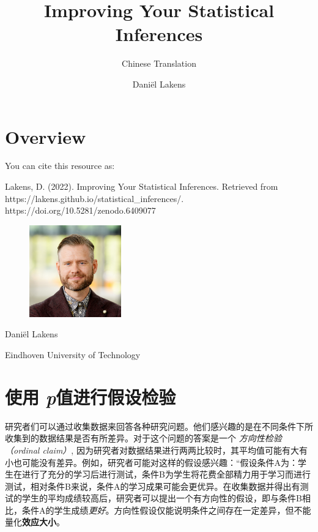 \documentclass[
  letterpaper,
  DIV=11,
  numbers=noendperiod]{scrreprt}
\title{Improving Your Statistical Inferences}
\subtitle{Chinese Translation}
\author{Daniël Lakens}
\date{}
\renewcommand*\contentsname{Table of contents}
\newcommand\contentsname{Table of contents}
\begin{document}
\maketitle
\ifdefined\Shaded\renewenvironment{Shaded}{\begin{tcolorbox}[breakable, interior hidden, frame hidden, boxrule=0pt, sharp corners, borderline west={3pt}{0pt}{shadecolor}, enhanced]}{\end{tcolorbox}}\fi

\renewcommand*\contentsname{Table of contents}
{
\hypersetup{linkcolor=}
\setcounter{tocdepth}{2}
\tableofcontents
}

\hypertarget{overview}{%
\chapter*{Overview}\label{overview}}


You can cite this resource as:

Lakens, D. (2022). Improving Your Statistical Inferences. Retrieved from
https://lakens.github.io/statistical\_inferences/.
https://doi.org/10.5281/zenodo.6409077

\begin{figure}

\includegraphics[width=1.5625in,height=\textheight]{images/me.png} \hfill{}

\end{figure}

Daniël Lakens

Eindhoven University of Technology


\hypertarget{sec-pvalue}{%
\chapter{\texorpdfstring{使用
\emph{p}值进行假设检验}{使用 p值进行假设检验}}\label{sec-pvalue}}

研究者们可以通过收集数据来回答各种研究问题。他们感兴趣的是在不同条件下所收集到的数据结果是否有所差异。对于这个问题的答案是一个
\emph{方向性检验（ordinal claim）},
因为研究者对数据结果进行两两比较时，其平均值可能有大有小也可能没有差异。例如，研究者可能对这样的假设感兴趣：``假设条件A为：学生在进行了充分的学习后进行测试，条件B为学生将花费全部精力用于学习而进行测试，相对条件B来说，条件A的学习成果可能会更优异。在收集数据并得出有测试的学生的平均成绩较高后，研究者可以提出一个有方向性的假设，即与条件B相比，条件A的学生成绩\emph{更好}。方向性假设仅能说明条件之间存在一定差异，但不能量化\textbf{效应大小}。
\end{document}
